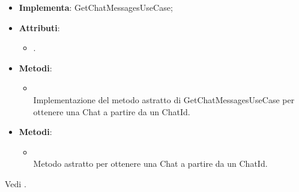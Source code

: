 \documentclass[10pt, a4paper]{article}
\begin{document}
\label{GetChatMessagesServiceDettaglio}
\begin{itemize}
    \item \textbf{Implementa}: GetChatMessagesUseCase;
    \item \textbf{Attributi}:
    \begin{itemize}
        \item {}.
    \end{itemize}
    \item \textbf{Metodi}:
    \begin{itemize}
        \item {}\\
        Implementazione del metodo astratto di GetChatMessagesUseCase per ottenere una Chat a partire da un ChatId.
    \end{itemize}
\end{itemize}

\label{GetChatMessagesUseCaseDettaglio}
\begin{itemize}
    \item \textbf{Metodi}:
    \begin{itemize}
        \item {}\\
        Metodo astratto per ottenere una Chat a partire da un ChatId.
    \end{itemize}
\end{itemize}

Vedi .
\end{document}

